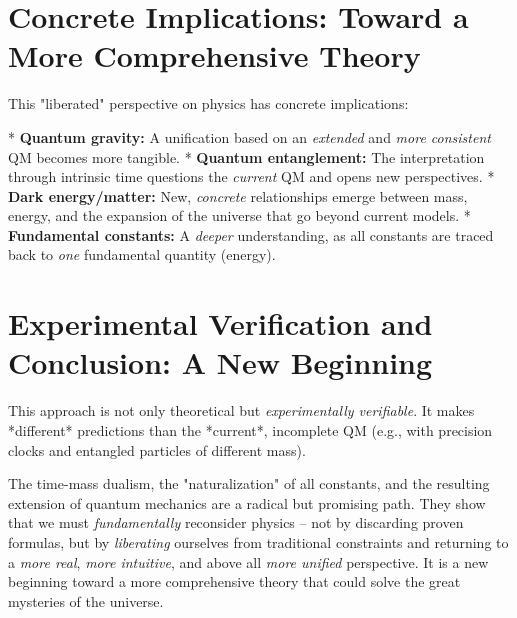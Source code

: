 \documentclass[a4paper,12pt]{article}
\begin{document}
	\section{Concrete Implications: Toward a More Comprehensive Theory}
	
	This "liberated" perspective on physics has concrete implications:
	
	*   \textbf{Quantum gravity:} A unification based on an \emph{extended} and \emph{more consistent} QM becomes more tangible.
	*   \textbf{Quantum entanglement:} The interpretation through intrinsic time questions the \emph{current} QM and opens new perspectives.
	*   \textbf{Dark energy/matter:} New, \emph{concrete} relationships emerge between mass, energy, and the expansion of the universe that go beyond current models.
	*   \textbf{Fundamental constants:} A \emph{deeper} understanding, as all constants are traced back to \emph{one} fundamental quantity (energy).
	
	\section{Experimental Verification and Conclusion: A New Beginning}
	
	This approach is not only theoretical but \emph{experimentally verifiable}. It makes *different* predictions than the *current*, incomplete QM (e.g., with precision clocks and entangled particles of different mass).
	
	The time-mass dualism, the "naturalization" of all constants, and the resulting extension of quantum mechanics are a radical but promising path. They show that we must \emph{fundamentally} reconsider physics – not by discarding proven formulas, but by \emph{liberating} ourselves from traditional constraints and returning to a \emph{more real}, \emph{more intuitive}, and above all \emph{more unified} perspective. It is a new beginning toward a more comprehensive theory that could solve the great mysteries of the universe.
\end{document}
